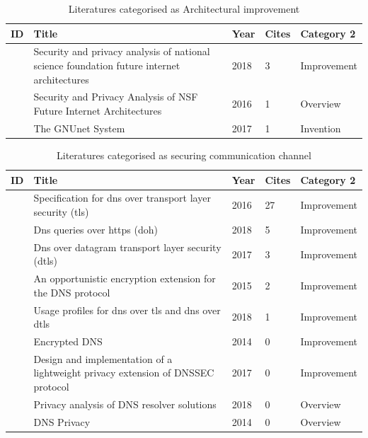 \documentclass[a4paper,12pt]{article}
\begin{document}
\begin{table}[h!]
    \begin{tabular}{ | l | p{9cm} | l | l | l | }
        \hline
            ID & Title & Year & Cites & Category 2 \\ \hline
            \cite{ambrosin2018security} & Security and privacy analysis of national science foundation future internet architectures & 2018 & 3 & Improvement \\ \hline
            \cite{ambrosin2016security} & Security and Privacy Analysis of NSF Future Internet Architectures & 2016 & 1 & Overview \\ \hline
            \cite{grothoff2017gnunet} & The GNUnet System & 2017 & 1 & Invention \\ \hline
        \end{tabular}
        \caption{Literatures categorised as Architectural improvement}
\label{architectures}
\end{table}
\begin{table}[h!]
    \begin{tabular}{ | l | p{9cm} | l | l | l | }
        \hline
            ID & Title & Year & Cites & Category 2 \\ \hline
            \cite{hu2016specification} & Specification for dns over transport layer security (tls) & 2016 & 27 & Improvement \\ \hline
            \cite{rfc8484} & Dns queries over https (doh) & 2018 & 5 & Improvement \\ \hline
            \cite{reddy2017dns} & Dns over datagram transport layer security (dtls) & 2017 & 3 & Improvement \\ \hline
            \cite{bucuti2015opportunistic} & An opportunistic encryption extension for the DNS protocol & 2015 & 2 & Improvement \\ \hline
            \cite{dickinson2018usage} & Usage profiles for dns over tls and dns over dtls & 2018 & 1 & Improvement \\ \hline
            \cite{bucuti2014encrypted} & Encrypted DNS & 2014 & 0 & Improvement \\ \hline
            \cite{saraj2017design} & Design and implementation of a lightweight privacy extension of DNSSEC protocol & 2017 & 0 & Improvement \\ \hline
            \cite{van2018privacy} & Privacy analysis of DNS resolver solutions & 2018 & 0 & Overview \\ \hline
            \cite{werneck2014dns} & DNS Privacy & 2014 & 0 & Overview \\ \hline
        \end{tabular}
        \caption{Literatures categorised as securing communication channel}
\label{channel}
\end{table}
\end{document}
